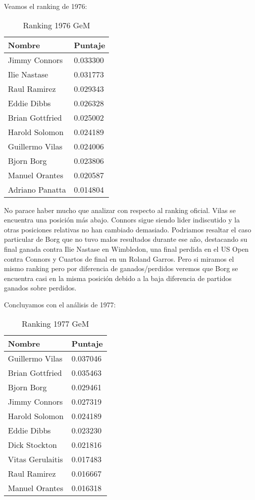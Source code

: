 Veamos el ranking de 1976:

\begin{table}[H]
\label{my-label}
\begin{tabular}{ll}
\hline
Nombre  & Puntaje \\ \hline
Jimmy Connors & 0.033300 \\
Ilie Nastase & 0.031773 \\
Raul Ramirez & 0.029343 \\
Eddie Dibbs  & 0.026328 \\
Brian Gottfried  & 0.025002 \\
Harold Solomon & 0.024189 \\
Guillermo Vilas & 0.024006 \\
Bjorn Borg  & 0.023806 \\
Manuel Orantes & 0.020587 \\
Adriano Panatta & 0.014804 \\ \hline 
\end{tabular}
\centering
\caption{Ranking 1976 GeM}
\end{table}

No parace haber mucho que analizar con respecto al ranking oficial. Vilas se encuentra una posición más abajo. Connors sigue siendo lider indiscutido y la otras posiciones relativas no han cambiado demasiado. Podriamos resaltar el caso particular de Borg que no tuvo malos resultados durante ese año, destacando su final ganada contra Ilie Nastase en Wimbledon, una final perdida en el US Open contra Connors y Cuartos de final en un Roland Garros. Pero si miramos el mismo ranking pero por diferencia de ganados/perdidos veremos que Borg se encuentra casi en la misma posición debido a la baja diferencia de partidos ganados sobre perdidos.

Concluyamos con el análisis de 1977: 

\begin{table}[H]
\label{my-label}
\begin{tabular}{ll}
\hline
Nombre  & Puntaje \\ \hline
Guillermo Vilas & 0.037046 \\
Brian Gottfried  & 0.035463 \\
Bjorn Borg  & 0.029461 \\
Jimmy Connors & 0.027319 \\
Harold Solomon & 0.024189 \\
Eddie Dibbs  & 0.023230 \\
Dick Stockton  & 0.021816 \\
Vitas Gerulaitis & 0.017483 \\
Raul Ramirez & 0.016667 \\
Manuel Orantes & 0.016318 \\ \hline 
\end{tabular}
\centering
\caption{Ranking 1977 GeM}
\end{table}

